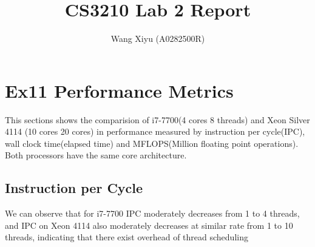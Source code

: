 \documentclass[a4paper]{article}
\begin{document}
\title{CS3210 Lab 2 Report}
\author{
  Wang Xiyu (A0282500R)
}
\maketitle
\section*{Ex11 Performance Metrics}
This sections shows the comparision of i7-7700(4 cores 8 threads) 
and Xeon Silver 4114 (10 cores 20 cores) in performance measured
 by instruction per cycle(IPC), wall clock time(elapsed time)
  and MFLOPS(Million floating point operations). 
  Both processors have the same core architecture.
\subsection*{Instruction per Cycle}
\par\vspace{3ex}
\begin{minipage}{0.5\linewidth}
    \noindent{}
\end{minipage}\hfill
\begin{minipage}{0.4\linewidth}
    We can observe that for i7-7700 IPC moderately decreases from 1 to 4 threads, and IPC on Xeon 4114 
    also moderately decreases at similar rate from 1 to 10 threads,
    indicating that there exist overhead of thread scheduling 
\end{minipage}\hfill
\end{document}
